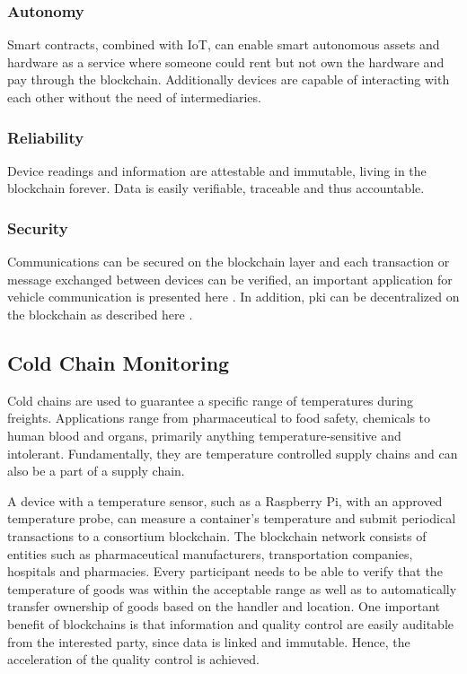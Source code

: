 \subsubsection{Autonomy}
Smart contracts, combined with IoT, can enable smart autonomous assets and hardware as a service where someone could rent but not own the hardware and pay through the blockchain. Additionally devices are capable of interacting with each other without the need of intermediaries.

\subsubsection{Reliability}
Device readings and information are attestable and immutable, living in the blockchain forever. Data is easily verifiable, traceable and thus accountable.

\subsubsection{Security}
Communications can be secured on the blockchain layer and each transaction or message exchanged between devices can be verified, an important application for vehicle communication is presented here \cite{lasla2018efficient}. In addition, \acrshort{pki} can be decentralized on the blockchain as described here \cite{fromknecht2014decentralized}.

\subsection{Cold Chain Monitoring}
\label{subsec:cold-chain-monitoring}
Cold chains are used to guarantee a specific range of temperatures during freights. Applications range from pharmaceutical to food safety, chemicals to human blood and organs, primarily anything temperature-sensitive and intolerant. Fundamentally, they are temperature controlled supply chains and can also be a part of a supply chain. 

A device with a temperature sensor, such as a Raspberry Pi, with an approved temperature probe, can measure a container's temperature and submit periodical transactions to a consortium blockchain. The blockchain network consists of entities such as pharmaceutical manufacturers, transportation companies, hospitals and pharmacies. Every participant needs to be able to verify that the temperature of goods was within the acceptable range as well as to automatically transfer ownership of goods based on the handler and location. One important benefit of blockchains is that information and quality control are easily auditable from the interested party, since data is linked and immutable. Hence, the acceleration of the quality control is achieved.

